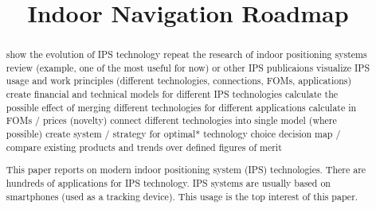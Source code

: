 \documentclass[conference]{IEEEtran}
\begin{document}
\title{Indoor Navigation Roadmap}

\author{
}


\maketitle

\begin{abstract}

show the evolution of IPS technology
    repeat the research of indoor positioning systems review (example, one of the most useful for now) or other IPS publicaions
    visualize IPS usage and work principles (different technologies, connections, FOMs, applications)
create financial and technical models for different IPS technologies
calculate the possible effect of merging different technologies for different applications
    calculate in FOMs / prices (novelty)
connect different technologies into single model (where possible)
create system / strategy for optimal* technology choice decision
    map / compare existing products and trends over defined figures of merit



  This paper reports on modern indoor positioning system (IPS) technologies.
  There are hundreds of applications for IPS technology. IPS systems are usually based on smartphones (used as a tracking device). This usage is the top interest of this paper.



\end{abstract}
\end{document}
